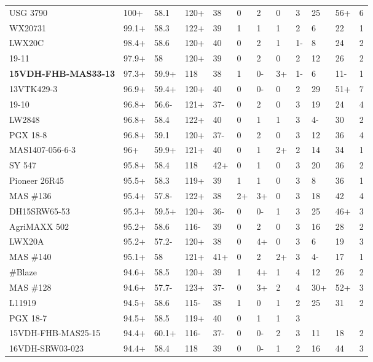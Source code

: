\documentclass[12pt, letterpaper]{article}
\begin{document}
\begin{landscape}
\begin{ThreePartTable}
\begin{longtable}{llllllllllll}
  USG 3790 & 100+ & 58.1 & 120+ & 38 & 0 & 2 & 0 & 3 & 25 & 56+ & 6 \\ 
  WX20731 & 99.1+ & 58.3 & 122+ & 39 & 1 & 1 & 1 & 2 & 6 & 22 & 1 \\ 
  LWX20C & 98.4+ & 58.6 & 120+ & 40 & 0 & 2 & 1 & 1- & 8 & 24 & 2 \\ 
  19-11 & 97.9+ & 58 & 120+ & 39 & 0 & 2 & 0 & 2 & 12 & 26 & 2 \\ 
  \textbf{15VDH-FHB-MAS33-13} & 97.3+ & 59.9+ & 118 & 38 & 1 & 0- & 3+ & 1- & 6 & 11- & 1 \\ 
  13VTK429-3 & 96.9+ & 59.4+ & 120+ & 40 & 0 & 0- & 0 & 2 & 29 & 51+ & 7 \\ 
  19-10 & 96.8+ & 56.6- & 121+ & 37- & 0 & 2 & 0 & 3 & 19 & 24 & 4 \\ 
  LW2848 & 96.8+ & 58.4 & 122+ & 40 & 0 & 1 & 1 & 3 & 4- & 30 & 2 \\ 
  PGX 18-8 & 96.8+ & 59.1 & 120+ & 37- & 0 & 2 & 0 & 3 & 12 & 36 & 4 \\ 
  MAS1407-056-6-3 & 96+ & 59.9+ & 121+ & 40 & 0 & 1 & 2+ & 2 & 14 & 34 & 1 \\ 
  SY 547 & 95.8+ & 58.4 & 118 & 42+ & 0 & 1 & 0 & 3 & 20 & 36 & 2 \\ 
  Pioneer 26R45 & 95.5+ & 58.3 & 119+ & 39 & 1 & 1 & 0 & 3 & 8 & 36 & 1 \\ 
  MAS \#136 & 95.4+ & 57.8- & 122+ & 38 & 2+ & 3+ & 0 & 3 & 18 & 42 & 4 \\ 
  DH15SRW65-53 & 95.3+ & 59.5+ & 120+ & 36- & 0 & 0- & 1 & 3 & 25 & 46+ & 3 \\ 
  AgriMAXX 502 & 95.2+ & 58.6 & 116- & 39 & 0 & 2 & 0 & 3 & 16 & 28 & 2 \\ 
  LWX20A & 95.2+ & 57.2- & 120+ & 38 & 0 & 4+ & 0 & 3 & 6 & 19 & 3 \\ 
  MAS \#140 & 95.1+ & 58 & 121+ & 41+ & 0 & 2 & 2+ & 3 & 4- & 17 & 1 \\ 
  \#Blaze & 94.6+ & 58.5 & 120+ & 39 & 1 & 4+ & 1 & 4 & 12 & 26 & 2 \\ 
  MAS \#128 & 94.6+ & 57.7- & 123+ & 37- & 0 & 3+ & 2 & 4 & 30+ & 52+ & 3 \\ 
  L11919 & 94.5+ & 58.6 & 115- & 38 & 1 & 0 & 1 & 2 & 25 & 31 & 2 \\ 
  PGX 18-7 & 94.5+ & 58.5 & 119+ & 40 & 0 & 1 & 1 & 3 &  &  &  \\ 
  15VDH-FHB-MAS25-15 & 94.4+ & 60.1+ & 116- & 37- & 0 & 0- & 2 & 3 & 11 & 18 & 2 \\ 
  16VDH-SRW03-023 & 94.4+ & 58.4 & 118 & 39 & 0 & 0- & 1 & 2 & 16 & 44 & 3 \\ 

\end{longtable}
\end{ThreePartTable}
\end{landscape}
\end{document}
